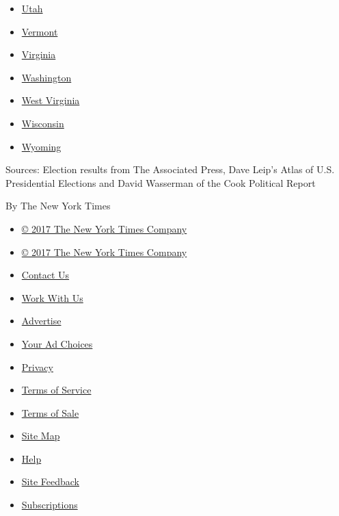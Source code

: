 \begin{itemize}
\item
  \href{//www.nytimes.com/elections/2016/results/utah}{Utah}
\item
  \href{//www.nytimes.com/elections/2016/results/vermont}{Vermont}
\item
  \href{//www.nytimes.com/elections/2016/results/virginia}{Virginia}
\item
  \href{//www.nytimes.com/elections/2016/results/washington}{Washington}
\item
  \href{//www.nytimes.com/elections/2016/results/west-virginia}{West
  Virginia}
\item
  \href{//www.nytimes.com/elections/2016/results/wisconsin}{Wisconsin}
\item
  \href{//www.nytimes.com/elections/2016/results/wyoming}{Wyoming}
\end{itemize}

Sources: Election results from The Associated Press, Dave Leip's Atlas
of U.S. Presidential Elections and David Wasserman of the Cook Political
Report

By The New York Times

\begin{itemize}
\tightlist
\item
  \href{//www.nytco.com}{© 2017 The New York Times Company}
\end{itemize}

\begin{itemize}
\tightlist
\item
  \href{//www.nytco.com}{© 2017 The New York Times Company}
\item
  \href{//www.nytimes.com/ref/membercenter/help/infoservdirectory.html}{Contact
  Us}
\item
  \href{//www.nytco.com/careers}{Work With Us}
\item
  \href{//www.nytimes.whsites.net/mediakit}{Advertise}
\item
  \href{//www.nytimes.com/content/help/rights/privacy/policy/privacy-policy.html\#pp}{Your
  Ad Choices}
\item
  \href{//www.nytimes.com/privacy}{Privacy}
\item
  \href{//www.nytimes.com/ref/membercenter/help/agree.html}{Terms of
  Service}
\item
  \href{//www.nytimes.com/content/help/rights/sale/terms-of-sale.html}{Terms
  of Sale}
\end{itemize}

\begin{itemize}
\tightlist
\item
  \href{//spiderbites.nytimes.com}{Site Map}
\item
  \href{//www.nytimes.com/membercenter/sitehelp.html}{Help}
\item
  \href{https://myaccount.nytimes.com/membercenter/feedback.html}{Site
  Feedback}
\item
  \href{//www.nytimes.com/subscriptions/Multiproduct/lp5558.html?campaignId=37WXW}{Subscriptions}
\end{itemize}
